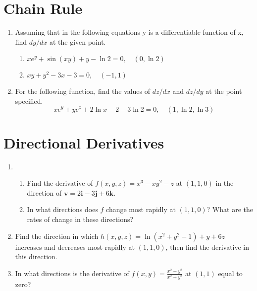 \documentclass[letterpaper, 11pt]{article}
\begin{document}
\section{Chain Rule}
\begin{enumerate}
\item Assuming that in the following equations y is a differentiable function of x, find $dy/dx$ at the given point. 
\begin{enumerate}[label=(\alph*)]
\item $xe^y + \sin(xy) + y - \ln 2 = 0, \quad (0, \ln 2)$

\item $xy + y^2 - 3x - 3 = 0, \quad (-1,1)$

\end{enumerate}

\item For the following function, find the values of $dz/dx$ and $dz/dy$ at the point specified.
\[ xe^y + y e^z  + 2 \ln x - 2 - 3 \ln2 = 0, \quad (1, \ln 2, \ln3) \]

\end{enumerate}


\section{Directional Derivatives}
\begin{enumerate}
\item \begin{enumerate}[label = (\alph*)]
\item Find the derivative of $f(x,y,z) = x^3 - xy^2 - z$ at $(1,1,0)$ in the direction of $\bm{v} = 2 \bm{i} -3 \bm{j} + 6 \bm{k}$.
\item In what directions does $f$ change most rapidly at $(1,1,0)$? What are the rates of change in these directions?


\end{enumerate}


\item Find the direction in which $h(x,y,z) = \ln(x^2 + y^2 -1) + y + 6z$ increases and decreases most rapidly at $(1,1,0)$, then find the derivative in this direction. 


\item In what directions is the derivative of $f(x,y) = \frac{ x^2 - y^2}{x^2 + y^2}$ at $(1,1)$ equal to zero? 


\end{enumerate}
\end{document}
